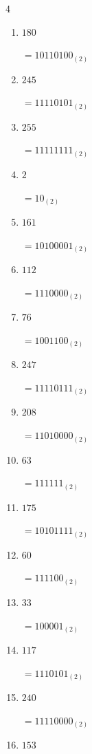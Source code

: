 \begin{multicols}{4}
\begin{enumerate}
        $=11010110_{(2)}$

  \item $180$

        $=10110100_{(2)}$

  \item $245$

        $=11110101_{(2)}$

\columnbreak %

  \item $255$

        $=11111111_{(2)}$

  \item $2$

        $=10_{(2)}$

  \item $161$

        $=10100001_{(2)}$

  \item $112$

        $=1110000_{(2)}$

  \item $76$

        $=1001100_{(2)}$

  \item $247$

        $=11110111_{(2)}$

  \item $208$

        $=11010000_{(2)}$

  \item $63$

        $=111111_{(2)}$

  \item $175$

        $=10101111_{(2)}$

  \item $60$

        $=111100_{(2)}$

  \item $33$

        $=100001_{(2)}$

  \item $117$

        $=1110101_{(2)}$

  \item $240$

        $=11110000_{(2)}$

  \item $153$


\end{enumerate}
\end{multicols}
